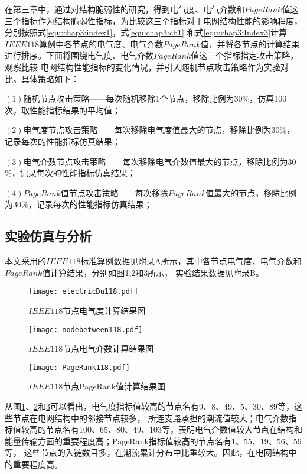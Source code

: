 在第三章中，通过对结构脆弱性的研究，得到电气度、电气介数和$PageRank$值这三个指标作为结构脆弱性指标，为比较这三个指标对于电网结构性能的影响程度，分别按照式\ref{equ:chap3:index1}，式\ref{equ:chap3:cb1}
和式\ref{equ:chap3:Index3}计算$IEEE118$算例中各节点的电气度、电气介数$PageRank$值，并将各节点的计算结果进行排序。下面将围绕电气度、电气介数$PageRank$值这三个指标指定攻击策略，观察比较
电网结构性能指标的变化情况，并引入随机节点攻击策略作为实验对比。具体策略如下：

$(1)$随机节点攻击策略——每次随机移除1个节点，移除比例为30$\%$，仿真100次，取性能指标结果的平均值；

$(2)$电气度节点攻击策略——每次移除电气度值最大的节点，移除比例为30$\%$，记录每次的性能指标仿真结果；

$(3)$电气介数节点攻击策略——每次移除电气介数值最大的节点，移除比例为30$\%$，记录每次的性能指标仿真结果；

$(4)$$PageRank$值节点攻击策略——每次移除$PageRank$值最大的节点，移除比例为30$\%$，记录每次的性能指标仿真结果；



\subsection{实验仿真与分析}
\label{sec:modelIntroduce}
本文采用的$IEEE118$标准算例数据见附录A所示，其中各节点电气度、电气介数和$PageRank$值计算结果，分别如图\ref{fig:electricDu118},\ref{fig:nodeBetween118}和\ref{fig:pagerank118}所示，
实验结果数据见附录B。
\begin{figure}[H] %
    \centering
    \texttt{[image: electricDu118.pdf]}
    \caption{$IEEE118$节点电气度计算结果图}
    \label{fig:electricDu118}
  \end{figure}
\begin{figure}[H] %
    \centering
    \texttt{[image: nodebetween118.pdf]}
    \caption{$IEEE118$节点电气介数计算结果图}
    \label{fig:nodeBetween118}
\end{figure}
\begin{figure}[H] %
    \centering
    \texttt{[image: PageRank118.pdf]}
    \caption{$IEEE118$节点PageRank值计算结果图}
    \label{fig:pagerank118}
\end{figure}

从图\ref{fig:electricDu118}、\ref{fig:nodeBetween118}和\ref{fig:pagerank118}可以看出，电气度指标值较高的节点名有9、8、49、5、30、89等，这些节点在电网结构中的邻接节点较多，
所连支路承担的潮流值较大；电气介数指标值较高的节点名有100、65、80、49、103等，表明电气介数值较大节点在结构和能量传输方面的重要程度高；PageRank指标值较高的节点名有1、55、19、56、59等，
这些节点的入链数目多，在潮流累计分布中比重较大。因此，在电网结构中的重要程度高。

